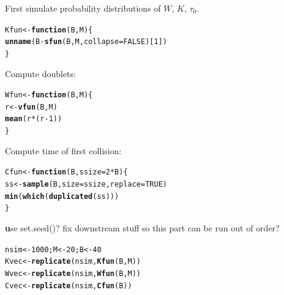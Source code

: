 \documentclass{article}\usepackage[]{graphicx}\usepackage[]{color}
\makeatletter
\newcommand{\hlnum}[1]{\textcolor[rgb]{0.686,0.059,0.569}{#1}}%
\newcommand{\hlopt}[1]{\textcolor[rgb]{0,0,0}{#1}}%
\newcommand{\hlstd}[1]{\textcolor[rgb]{0.345,0.345,0.345}{#1}}%
\newcommand{\hlkwa}[1]{\textcolor[rgb]{0.161,0.373,0.58}{\textbf{#1}}}%
\newcommand{\hlkwb}[1]{\textcolor[rgb]{0.69,0.353,0.396}{#1}}%
\newcommand{\hlkwc}[1]{\textcolor[rgb]{0.333,0.667,0.333}{#1}}%
\newcommand{\hlkwd}[1]{\textcolor[rgb]{0.737,0.353,0.396}{\textbf{#1}}}%
\newenvironment{kframe}{%
 \def\at@end@of@kframe{}%
 \ifinner\ifhmode%
  \def\at@end@of@kframe{\end{minipage}}%
  \begin{minipage}{\columnwidth}%
 \fi\fi%
 \def\FrameCommand##1{\hskip\@totalleftmargin \hskip-\fboxsep
 \colorbox{shadecolor}{##1}\hskip-\fboxsep
     \hskip-\linewidth \hskip-\@totalleftmargin \hskip\columnwidth}%
 \MakeFramed {\advance\hsize-\width
   \@totalleftmargin\z@ \linewidth\hsize
   \@setminipage}}%
 {\par\unskip\endMakeFramed%
 \at@end@of@kframe}
\newenvironment{knitrout}{}{} %
\newcommand{\fixme}[1]{{\textbf #1}}
\newcommand{\fixme}[1]{\textbf{FIXME: #1}}
\makeatother
\begin{document}
First simulate probability distributions of $W$, $K$, $\tau_0$.
\begin{knitrout}
\color{fgcolor}\begin{kframe}
\begin{alltt}
\hlstd{Kfun} \hlkwb{<-} \hlkwa{function}\hlstd{(}\hlkwc{B}\hlstd{,}\hlkwc{M}\hlstd{) \{}
    \hlkwd{unname}\hlstd{(B}\hlopt{-}\hlkwd{sfun}\hlstd{(B,M,}\hlkwc{collapse}\hlstd{=}\hlnum{FALSE}\hlstd{)[}\hlnum{1}\hlstd{])}
\hlstd{\}}
\end{alltt}
\end{kframe}
\end{knitrout}

Compute doublets:
\begin{knitrout}
\color{fgcolor}\begin{kframe}
\begin{alltt}
\hlstd{Wfun} \hlkwb{<-} \hlkwa{function}\hlstd{(}\hlkwc{B}\hlstd{,}\hlkwc{M}\hlstd{) \{}
    \hlstd{r} \hlkwb{<-} \hlkwd{vfun}\hlstd{(B,M)}
    \hlkwd{mean}\hlstd{(r}\hlopt{*}\hlstd{(r}\hlopt{-}\hlnum{1}\hlstd{))}
\hlstd{\}}
\end{alltt}
\end{kframe}
\end{knitrout}

Compute time of first collision:
\begin{knitrout}
\color{fgcolor}\begin{kframe}
\begin{alltt}
\hlstd{Cfun} \hlkwb{<-} \hlkwa{function}\hlstd{(}\hlkwc{B}\hlstd{,}\hlkwc{ssize}\hlstd{=}\hlnum{2}\hlopt{*}\hlstd{B) \{}
    \hlstd{ss} \hlkwb{<-} \hlkwd{sample}\hlstd{(B,}\hlkwc{size}\hlstd{=ssize,}\hlkwc{replace}\hlstd{=}\hlnum{TRUE}\hlstd{)}
    \hlkwd{min}\hlstd{(}\hlkwd{which}\hlstd{(}\hlkwd{duplicated}\hlstd{(ss)))}
\hlstd{\}}
\end{alltt}
\end{kframe}
\end{knitrout}

\fixme{use set.seed()? fix downstream stuff so this part
can be run out of order?}
\begin{knitrout}
\color{fgcolor}\begin{kframe}
\begin{alltt}
\hlstd{nsim} \hlkwb{<-} \hlnum{1000}\hlstd{; M} \hlkwb{<-} \hlnum{20}\hlstd{; B} \hlkwb{<-} \hlnum{40}
\hlstd{Kvec} \hlkwb{<-} \hlkwd{replicate}\hlstd{(nsim,}\hlkwd{Kfun}\hlstd{(B,M))}
\hlstd{Wvec} \hlkwb{<-} \hlkwd{replicate}\hlstd{(nsim,}\hlkwd{Wfun}\hlstd{(B,M))}
\hlstd{Cvec} \hlkwb{<-} \hlkwd{replicate}\hlstd{(nsim,}\hlkwd{Cfun}\hlstd{(B))}
\end{alltt}
\end{kframe}
\end{knitrout}
\end{document}
